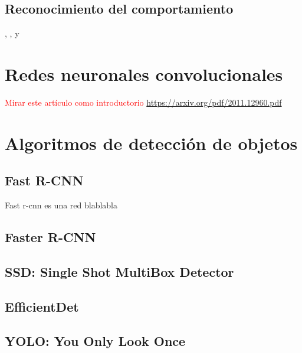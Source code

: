 \newpage

\subsection{Reconocimiento del comportamiento}
\label{subsec:tecnicas-reconocimiento-comportamiento}

\cite{vishwakarma2012}, \cite{borges2013}, \cite{popoola2012} y \cite{BENMABROUK2018480}

\newpage

\section{Redes neuronales convolucionales}

\textcolor{red}{Mirar este artículo como introductorio \url{https://arxiv.org/pdf/2011.12960.pdf}}

\newpage

\section{Algoritmos de detección de objetos}
\label{sec:tecnicas-utilizadas-detection}

\subsection{Fast R-CNN}
\label{subsec:fast-rcnn}

Fast \gls{r-cnn} es una red blablabla

\newpage

\subsection{Faster R-CNN}
\label{subsec:faster-rcnn}

\newpage

\subsection{SSD: Single Shot MultiBox Detector}
\label{subsec:ssd}

\newpage

\subsection{EfficientDet}
\label{subsec:efficientdet}

\newpage

\subsection{YOLO: You Only Look Once}
\label{subsec:yolo}

